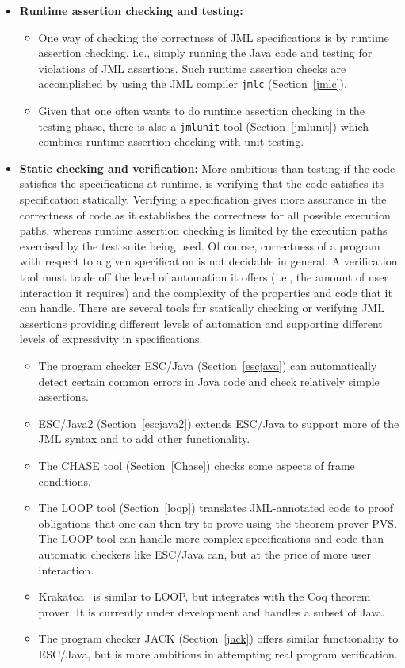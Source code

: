 \begin{itemize}
\item {\bf Runtime assertion checking and testing:}
\begin{itemize}
\item One way of checking the correctness of JML specifications is by
  runtime assertion checking, i.e., simply running the Java code and
  testing for violations of JML assertions.  Such runtime assertion
  checks are accomplished by using the JML compiler {\tt jmlc}
  (Section~\ref{jmlc}).
\item Given that one often wants to do runtime assertion checking in
  the testing phase, there is also a {\tt jmlunit} tool
  (Section~\ref{jmlunit}) which combines runtime assertion checking
  with unit testing.
\end{itemize}
\item {\bf Static checking and verification:} More ambitious than
  testing if the code satisfies the specifications at runtime, is
  verifying that the code satisfies its specification statically.
  Verifying a specification gives more assurance in the correctness of
  code as it establishes the correctness for all possible execution paths,
  whereas runtime assertion checking is limited by the execution paths
  exercised by the test suite being used.  Of course, correctness of a
  program with respect to a given specification is not decidable in
  general.  A verification tool must trade off the level of automation
  it offers (i.e., the amount of user interaction it requires) and the
  complexity of the properties and code that it can handle.  There are
  several tools for statically checking or verifying JML assertions
  providing different levels of automation and supporting different
  levels of expressivity in specifications.
\begin{itemize}
\item The program checker ESC/Java (Section~\ref{escjava}) can
  automatically detect certain common errors in Java code and check
  relatively simple assertions.
\item ESC/Java2 (Section~\ref{escjava2}) extends ESC/Java
  to support more of the JML syntax and to add other functionality.
\item The CHASE tool (Section~\ref{Chase}) checks some aspects of
  frame conditions.
\item The LOOP tool (Section~\ref{loop}) translates JML-annotated code
  to proof obligations that one can then try to prove using the
  theorem prover PVS\@.  The LOOP tool can handle more complex
  specifications and code than automatic checkers like ESC/Java can,
  but at the price of more user interaction.
\item Krakatoa~\cite{krakatoa03a} is similar to LOOP, but integrates
  with the Coq theorem prover.  It is currently under development and
  handles a subset of Java.
\item The program checker JACK (Section~\ref{jack}) offers similar
  functionality to ESC/Java, but is more ambitious in attempting real
  program verification.
\end{itemize}


\end{itemize}
